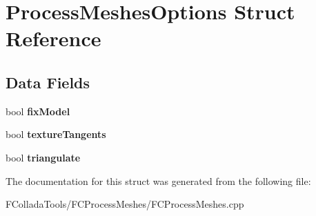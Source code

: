 \hypertarget{structProcessMeshesOptions}{
\section{ProcessMeshesOptions Struct Reference}
\label{structProcessMeshesOptions}
}
\subsection*{Data Fields}
\begin{DoxyCompactItemize}
\item 
\hypertarget{structProcessMeshesOptions_a000c4bf327570662e861ab5fe43d81f4}{
bool {\bfseries fixModel}}
\label{structProcessMeshesOptions_a000c4bf327570662e861ab5fe43d81f4}

\item 
\hypertarget{structProcessMeshesOptions_a1236a6de5275b3f7ee9df6a9ebbcc7cb}{
bool {\bfseries textureTangents}}
\label{structProcessMeshesOptions_a1236a6de5275b3f7ee9df6a9ebbcc7cb}

\item 
\hypertarget{structProcessMeshesOptions_a227377e2f85842bb9ee5596b292360ca}{
bool {\bfseries triangulate}}
\label{structProcessMeshesOptions_a227377e2f85842bb9ee5596b292360ca}

\end{DoxyCompactItemize}


The documentation for this struct was generated from the following file:\begin{DoxyCompactItemize}
\item 
FColladaTools/FCProcessMeshes/FCProcessMeshes.cpp\end{DoxyCompactItemize}
